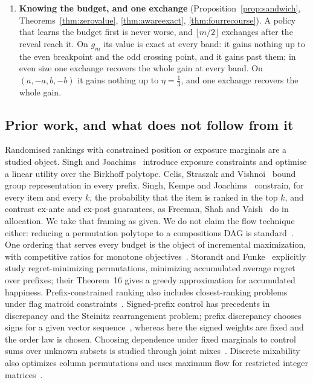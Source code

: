 \documentclass[conference]{IEEEtran}
\theoremstyle{definition}
\begin{document}
\begin{enumerate}
Choosing the budget after the draw multiplies the free value by $m-1$. Under the band the
ex-post value is known exactly, and there the band costs at most a factor $1+\frac1m$.
\item[6)] \textbf{Knowing the budget, and one exchange} (Proposition~\ref{prop:sandwich},
Theorems~\ref{thm:zerovalue}, \ref{thm:awareexact}, \ref{thm:fourrecourse}). A policy that learns
the budget first is never worse, and $\lfloor m/2\rfloor$ exchanges after the reveal reach it. On
$g_m$ its value is exact at every band: it gains nothing up to the even breakpoint and the odd
crossing point, and it gains past them; in even size one exchange recovers the whole gain at
every band. On $(a,-a,b,-b)$ it gains nothing up to $\eta=\frac13$, and one exchange recovers the
whole gain.
\end{enumerate}

\subsection{Prior work, and what does not follow from it}

Randomised rankings with constrained position or exposure marginals are a studied object.
Singh and Joachims~\cite{singh2018} introduce exposure constraints and optimise a linear
utility over the Birkhoff polytope. Celis, Straszak and Vishnoi~\cite{celis2018} bound group
representation in every prefix. Singh, Kempe and Joachims~\cite{singh2021} constrain, for every
item and every $k$, the probability that the item is ranked in the top $k$, and contrast ex-ante
and ex-post guarantees, as Freeman, Shah and Vaish~\cite{freeman2020} do in allocation. We
take that framing as given. We do not claim the flow technique either: reducing a permutation
polytope to a compositions DAG is standard~\cite{schrijver2003}. One ordering that serves every
budget is the object of incremental maximization, with competitive ratios for monotone
objectives~\cite{disser2023,bienkowski2026}. Storandt and Funke~\cite{storandt2019} explicitly
study regret-minimizing permutations, minimizing accumulated average regret over prefixes;
their Theorem~16 gives a greedy approximation for accumulated happiness. Prefix-constrained
ranking also includes closest-ranking problems under flag matroid constraints~\cite{ando2026}.
Signed-prefix control has precedents in discrepancy and the Steinitz rearrangement problem;
prefix discrepancy chooses signs for a given vector sequence~\cite{bansal2021}, whereas here
the signed weights are fixed and the order law is chosen. Choosing dependence under fixed
marginals to control sums over unknown subsets is studied through joint mixes~\cite{koike2022}.
Discrete mixability also optimizes column permutations and uses maximum flow for restricted
integer matrices~\cite{bellini2016}.
\end{document}
